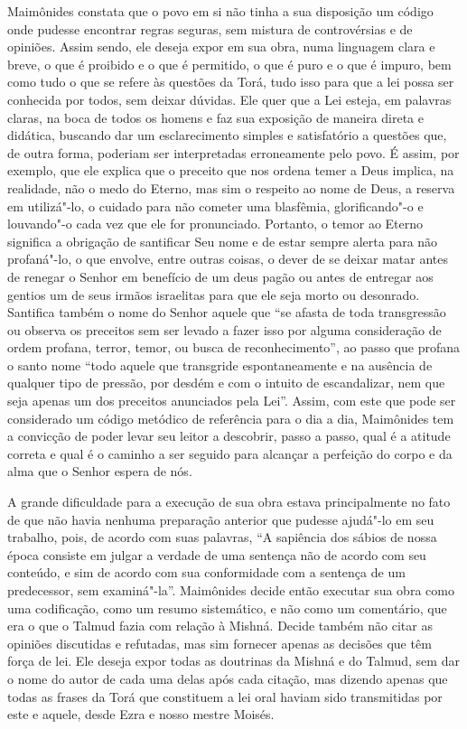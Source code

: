 Maimônides constata que o povo em si não tinha a sua disposição um
código onde pudesse encontrar regras seguras, sem mistura de
controvérsias e de opiniões. Assim sendo, ele deseja expor em sua obra,
numa linguagem clara e breve, o que é proibido e o que é permitido, o
que é puro e o que é impuro, bem como tudo o que se refere às questões
da Torá, tudo isso para que a lei possa ser conhecida por todos,
sem deixar dúvidas. Ele quer que a Lei esteja, em palavras claras, na
boca de todos os homens e faz sua exposição de maneira direta e
didática, buscando dar um esclarecimento simples e satisfatório a
questões que, de outra forma, poderiam ser interpretadas erroneamente
pelo povo. É assim, por exemplo, que ele explica que o preceito que nos
ordena temer a Deus implica, na realidade, não o medo do Eterno, mas
sim o respeito ao nome de Deus, a reserva em utilizá"-lo, o cuidado para
não cometer uma blasfêmia, glorificando"-o e louvando"-o cada vez que ele
for pronunciado. Portanto, o temor ao Eterno significa a obrigação de
santificar Seu nome e de estar sempre alerta para não profaná"-lo, o que
envolve, entre outras coisas, o dever de se deixar matar antes de
renegar o Senhor em benefício de um deus pagão ou antes de entregar aos
gentios um de seus irmãos israelitas para que ele seja morto ou
desonrado. Santifica também o nome do Senhor aquele que ``se afasta de
toda transgressão ou observa os preceitos sem ser levado a fazer isso
por alguma consideração de ordem profana, terror, temor, ou busca de
reconhecimento'', ao passo que profana o santo nome ``todo aquele que
transgride espontaneamente e na ausência de qualquer tipo de pressão,
por desdém e com o intuito de escandalizar, nem que seja apenas um dos
preceitos anunciados pela Lei''. Assim, com este que pode ser considerado
um código metódico de referência para o dia a dia, Maimônides tem a
convicção de poder levar seu leitor a descobrir, passo a passo, qual é a
atitude correta e qual é o caminho a ser seguido para alcançar a
perfeição do corpo e da alma que o Senhor espera de nós.

A grande dificuldade para a execução de sua obra estava principalmente
no fato de que não havia nenhuma preparação anterior que pudesse
ajudá"-lo em seu trabalho, pois, de acordo com suas palavras, ``A
sapiência dos sábios de nossa época consiste em julgar a verdade de uma
sentença não de acordo com seu conteúdo, e sim de acordo com sua
conformidade com a sentença de um predecessor, sem examiná"-la''.
Maimônides decide então executar sua obra como uma codificação, como um
resumo sistemático, e não como um comentário, que era o que o
Talmud fazia com relação à Mishná. Decide também não citar
as opiniões discutidas e refutadas, mas sim fornecer apenas as decisões
que têm força de lei. Ele deseja expor todas as doutrinas da
Mishná e do Talmud, sem dar o nome do autor de cada uma
delas após cada citação, mas dizendo apenas que todas as frases da
Torá que constituem a lei oral haviam sido transmitidas por este
e aquele, desde Ezra e nosso mestre Moisés.

